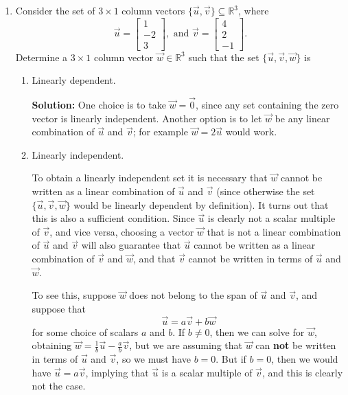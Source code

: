 \documentclass[letterpaper,12pt]{amsart}
\newcommand{\R}{\mathbb{R}}
\newcommand{\bbm}{\begin{bmatrix}}
\newcommand{\ebm}{\end{bmatrix}}
\begin{document}
\begin{enumerate}
\begin{enumerate}
 \end{enumerate}

\newpage

\item Consider the set of $3\times 1$ column vectors $\{\vec{u},\vec{v}\}\subseteq\R^3$, where
\[
 \vec{u} = \bbm 1\\-2\\3\ebm, \text{ and } \vec{v} = \bbm 4\\2\\-1\ebm.
\]
Determine a $3\times 1$ column vector $\vec{w}\in\R^3$ such that the set $\{\vec{u},\vec{v},\vec{w}\}$ is

\medskip

\begin{enumerate}
 \item Linearly dependent.

\bigskip

{\bf Solution:} One choice is to take $\vec{w}=\vec{0}$, since any set containing the zero vector is linearly independent. Another option is to let $\vec{w}$ be any linear combination of $\vec{u}$ and $\vec{v}$; for example $\vec{w} = 2\vec{u}$ would work.

\bigskip

 \item Linearly independent.

\bigskip

To obtain a linearly independent set it is necessary that $\vec{w}$ cannot be written as a linear combination of $\vec{u}$ and $\vec{v}$ (since otherwise the set $\{\vec{u},\vec{v},\vec{w}\}$ would be linearly dependent by definition). It turns out that this is also a sufficient condition. Since $\vec{u}$ is clearly not a scalar multiple of $\vec{v}$, and vice versa, choosing a vector $\vec{w}$ that is not a linear combination of $\vec{u}$ and $\vec{v}$ will also guarantee that $\vec{u}$ cannot be written as a linear combination of $\vec{v}$ and $\vec{w}$, and that $\vec{v}$ cannot be written in terms of $\vec{u}$ and $\vec{w}$.

To see this, suppose $\vec{w}$ does not belong to the span of $\vec{u}$ and $\vec{v}$, and suppose that
\[
 \vec{u} = a\vec{v}+b\vec{w}
\]
for some choice of scalars $a$ and $b$. If $b\neq 0$, then we can solve for $\vec{w}$, obtaining $\vec{w} = \frac{1}{b}\vec{u}-\frac{a}{b}\vec{v}$, but we are assuming that $\vec{w}$ can \textbf{not} be written in terms of $\vec{u}$ and $\vec{v}$, so we must have $b=0$. But if $b=0$, then we would have $\vec{u}=a\vec{v}$, implying that $\vec{u}$ is a scalar multiple of $\vec{v}$, and this is clearly not the case.


\end{enumerate}
\end{enumerate}
\end{document}
